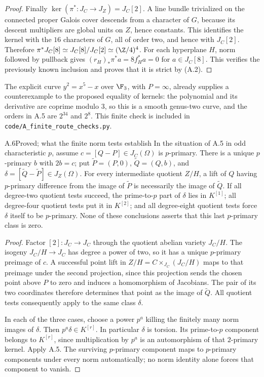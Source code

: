 \begin{proof}
Finally $\ker(\pi^*:J_C\to J_Z)=J_C[2]$.
A line bundle trivialized on the connected proper Galois cover
descends from a character of $G$, because its descent multipliers
are global units on $Z$, hence constants. This identifies the
kernel with the $16$ characters of $G$, all of order two, and hence
with $J_C[2]$. Therefore
$\pi^*J_C[8]\simeq J_C[8]/J_C[2]\simeq(\Z/4)^4$.
For each hyperplane $H$, norm followed by pullback gives
$(r_H)_*\pi^*a=8f_H^*a=0$ for $a\in J_C[8]$.
This verifies the previously known inclusion and proves that it
is strict by (A.2).
\end{proof}

The explicit curve $y^2=x^5-x$ over $\F_3$, with $P=\infty$,
already supplies a counterexample to the proposed equality of
kernels: the polynomial and its derivative are coprime modulo $3$,
so this is a smooth genus-two curve, and the orders in A.5 are
$2^{34}$ and $2^8$. This finite check is included in
\texttt{code/A\_finite\_route\_checks.py}.

\begin{claim}{A.6}{Proved; what the finite norm tests establish}
In the situation of A.5 in odd characteristic $p$, assume
$c=[Q-P]\in J_C(\Omega)$ is $p$-primary. There is a unique
$p$-primary $b$ with $2b=c$; put
$\widetilde P=(P,0)$, $\widetilde Q=(Q,b)$, and
$\delta=[\widetilde Q-\widetilde P]\in J_Z(\Omega)$.
For every intermediate quotient $Z/H$, a lift of $Q$ having
$p$-primary difference from the image of $\widetilde P$ is
necessarily the image of $\widetilde Q$.
If all degree-two quotient tests succeed, the prime-to-$p$ part
of $\delta$ lies in $K^{[1]}$; all degree-four quotient tests
put it in $K^{[2]}$; and all degree-eight quotient tests force
$\delta$ itself to be $p$-primary. None of these conclusions
asserts that this last $p$-primary class is zero.
\end{claim}
\begin{proof}
Factor $[2]:J_C\to J_C$ through the quotient abelian variety
$J_C/H$. The isogeny $J_C/H\to J_C$ has degree a power of two,
so it has a unique $p$-primary preimage of $c$. A successful point
lift in $Z/H=C\times_{J_C}(J_C/H)$ maps to that preimage under
the second projection, since this projection sends the chosen
point above $P$ to zero and induces a homomorphism of Jacobians.
The pair of its two coordinates therefore determines that point
as the image of $\widetilde Q$. All quotient tests consequently
apply to the same class $\delta$.

In each of the three cases, choose a power $p^a$ killing the
finitely many norm images of $\delta$. Then
$p^a\delta\in K^{[r]}$. In particular $\delta$ is torsion.
Its prime-to-$p$ component belongs to $K^{[r]}$, since multiplication
by $p^a$ is an automorphism of that $2$-primary kernel. Apply A.5.
The surviving $p$-primary component maps to $p$-primary components
under every norm automatically; no norm identity alone forces
that component to vanish.
\end{proof}

